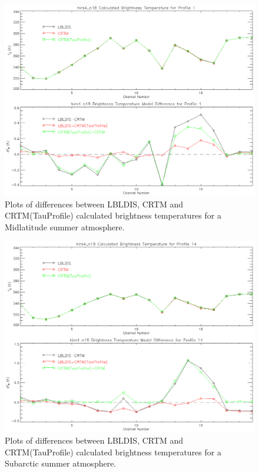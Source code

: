 \begin{figure}[htp]
  \centering{}
  \includegraphics[scale=0.8]{./graphics/Clear_Sky_Comparison_01.eps}
  \caption{Plots of differences between LBLDIS, CRTM and CRTM(TauProfile) calculated brightness temperatures for
   a Midlatitude summer atmosphere.}
  \label{fig:Clear_Sky_Midlatitude_summer}
\end{figure}

\begin{figure}[htp]
  \centering{}
  \includegraphics[scale=0.8]{./graphics/Clear_Sky_Comparison_14.eps}
  \caption{Plots of differences between LBLDIS, CRTM and CRTM(TauProfile) calculated brightness temperatures for
   a Subarctic summer atmosphere.}
  \label{fig:Clear_Sky_Subarctic_summer}
\end{figure}

